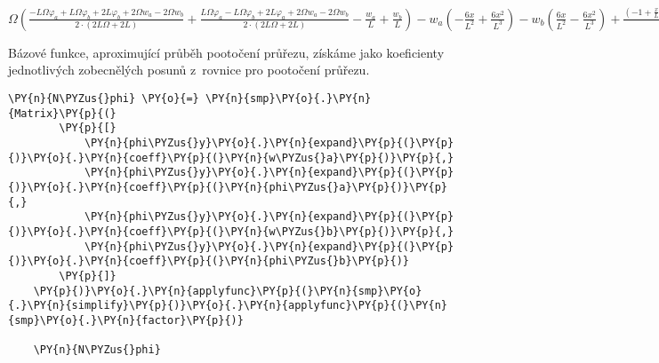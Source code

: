                 
    
    $\displaystyle \Omega \left(\frac{- L \Omega \varphi_{a} + L \Omega \varphi_{b} + 2 L \varphi_{b} + 2 \Omega w_{a} - 2 \Omega w_{b}}{2 \cdot \left(2 L \Omega + 2 L\right)} + \frac{L \Omega \varphi_{a} - L \Omega \varphi_{b} + 2 L \varphi_{a} + 2 \Omega w_{a} - 2 \Omega w_{b}}{2 \cdot \left(2 L \Omega + 2 L\right)} - \frac{w_{a}}{L} + \frac{w_{b}}{L}\right) - w_{a} \left(- \frac{6 x}{L^{2}} + \frac{6 x^{2}}{L^{3}}\right) - w_{b} \left(\frac{6 x}{L^{2}} - \frac{6 x^{2}}{L^{3}}\right) + \frac{\left(-1 + \frac{x}{L}\right)^{2} \left(L \Omega \varphi_{a} - L \Omega \varphi_{b} + 2 L \varphi_{a} + 2 \Omega w_{a} - 2 \Omega w_{b}\right)}{2 L \Omega + 2 L} + \frac{2 x \left(-1 + \frac{x}{L}\right) \left(L \Omega \varphi_{a} - L \Omega \varphi_{b} + 2 L \varphi_{a} + 2 \Omega w_{a} - 2 \Omega w_{b}\right)}{L \left(2 L \Omega + 2 L\right)} - \frac{2 x \left(1 - \frac{x}{L}\right) \left(- L \Omega \varphi_{a} + L \Omega \varphi_{b} + 2 L \varphi_{b} + 2 \Omega w_{a} - 2 \Omega w_{b}\right)}{L \left(2 L \Omega + 2 L\right)} + \frac{x^{2} \left(- L \Omega \varphi_{a} + L \Omega \varphi_{b} + 2 L \varphi_{b} + 2 \Omega w_{a} - 2 \Omega w_{b}\right)}{L^{2} \cdot \left(2 L \Omega + 2 L\right)}$
    
\vspace{0.3cm}
Bázové funkce, aproximující průběh pootočení průřezu, získáme jako koeficienty jednotlivých zobecnělých posunů z~rovnice pro pootočení průřezu.
    
\begin{tcolorbox}[breakable, size=fbox, boxrule=1pt, pad at break*=1mm,colback=cellbackground, colframe=cellborder]
    \begin{Verbatim}[commandchars=\\\{\}]
    \PY{n}{N\PYZus{}phi} \PY{o}{=} \PY{n}{smp}\PY{o}{.}\PY{n}{Matrix}\PY{p}{(}
        \PY{p}{[}
            \PY{n}{phi\PYZus{}y}\PY{o}{.}\PY{n}{expand}\PY{p}{(}\PY{p}{)}\PY{o}{.}\PY{n}{coeff}\PY{p}{(}\PY{n}{w\PYZus{}a}\PY{p}{)}\PY{p}{,}
            \PY{n}{phi\PYZus{}y}\PY{o}{.}\PY{n}{expand}\PY{p}{(}\PY{p}{)}\PY{o}{.}\PY{n}{coeff}\PY{p}{(}\PY{n}{phi\PYZus{}a}\PY{p}{)}\PY{p}{,}
            \PY{n}{phi\PYZus{}y}\PY{o}{.}\PY{n}{expand}\PY{p}{(}\PY{p}{)}\PY{o}{.}\PY{n}{coeff}\PY{p}{(}\PY{n}{w\PYZus{}b}\PY{p}{)}\PY{p}{,}
            \PY{n}{phi\PYZus{}y}\PY{o}{.}\PY{n}{expand}\PY{p}{(}\PY{p}{)}\PY{o}{.}\PY{n}{coeff}\PY{p}{(}\PY{n}{phi\PYZus{}b}\PY{p}{)}
        \PY{p}{]}
    \PY{p}{)}\PY{o}{.}\PY{n}{applyfunc}\PY{p}{(}\PY{n}{smp}\PY{o}{.}\PY{n}{simplify}\PY{p}{)}\PY{o}{.}\PY{n}{applyfunc}\PY{p}{(}\PY{n}{smp}\PY{o}{.}\PY{n}{factor}\PY{p}{)}
    
    \PY{n}{N\PYZus{}phi}
    \end{Verbatim}
\end{tcolorbox}
     
